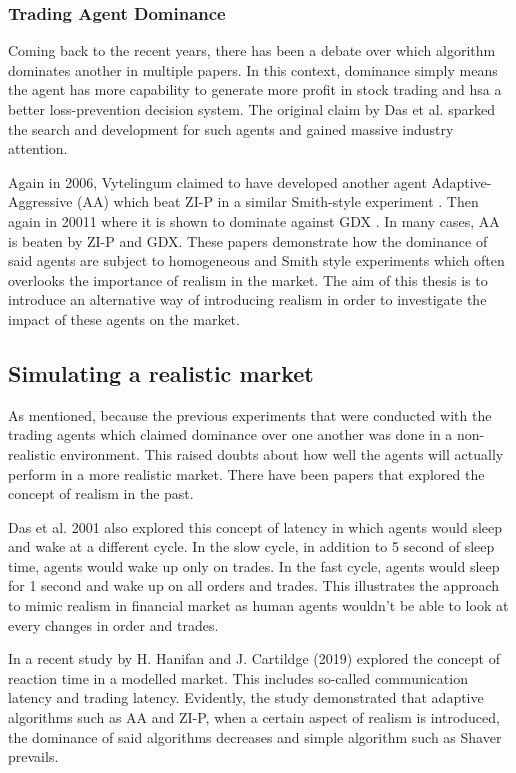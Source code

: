 \documentclass{article}
\begin{document}
\subsubsection{Trading Agent Dominance}
Coming back to the recent years, there has been a debate over which algorithm dominates another in multiple papers. In this context, dominance simply means the agent has more capability to generate more profit in stock trading and hsa a better loss-prevention decision system. The original claim by Das et al. sparked the search and development for such agents and gained massive industry attention. 

Again in 2006, Vytelingum claimed to have developed another agent Adaptive-Aggressive (AA) which beat ZI-P in a similar Smith-style experiment \cite{AA2006}. Then again in 20011 where it is shown to dominate against GDX \cite{deluca2011}. In many cases, AA is beaten by ZI-P and GDX. These papers demonstrate how the dominance of said agents are subject to homogeneous and Smith style experiments which often overlooks the importance of realism in the market. The aim of this thesis is to introduce an alternative way of introducing realism in order to investigate the impact of these agents on the market. 

\subsection{Simulating a realistic market}
As mentioned, because the previous experiments that were conducted with the trading agents which claimed dominance over one another was done in a non-realistic environment. This raised doubts about how well the agents will actually perform in a more realistic market. There have been papers that explored the concept of realism in the past. 

Das et al. 2001 \cite{das2001} also explored this concept of latency in which agents would sleep and wake at a different cycle. In the slow cycle, in addition to 5 second of sleep time, agents would wake up only on trades. In the fast cycle, agents would sleep for 1 second and wake up on all orders and trades. This illustrates the approach to mimic realism in financial market as human agents wouldn’t be able to look at every changes in order and trades. 

In a recent study by H. Hanifan and J. Cartildge (2019) \cite{foolsrush} explored the concept of reaction time in a modelled market. This includes so-called communication latency and trading latency. Evidently, the study demonstrated that adaptive algorithms such as AA and ZI-P, when a certain aspect of realism is introduced, the dominance of said algorithms decreases and simple algorithm such as Shaver prevails. 
\end{document}
